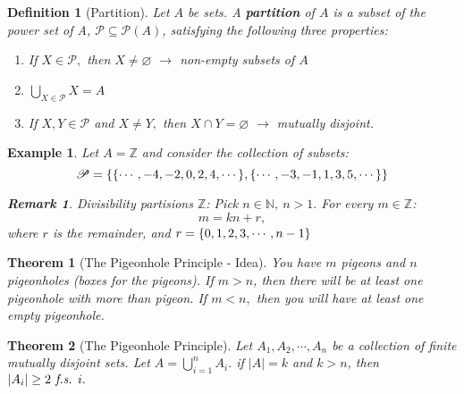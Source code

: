 \documentclass[12pt,a4paper]{article}
\newtheorem{thm}{Theorem}[subsection]
\newtheorem{df}{Definition}[subsection]
\newtheorem{eg}{Example}[subsection]
\newtheorem*{rmk}{\indent Remark}
\def\Z{{\mathbb{Z}}}
\def\N{{\mathbb{N}}}
\def\pow{{\mathcal{P}}}
\def\part{{\mathscr{P}}}
\def\emptyset{\varnothing}
\def\fs{\emph{ f.s. }}
\begin{document}
\begin{df}[Partition]
	Let $A$ be sets. A \textbf{partition} of $A$ is a subset of the power set of A, $\part\subseteq\pow(A)$, satisfying the following three properties:
	\begin{enumerate}
		\item If $X\in\part,$ then $X\neq\emptyset$ $\longrightarrow$ non-empty subsets of $A$
		\item $\displaystyle\bigcup_{X\in\part}X=A$
		\item If $X,Y\in\part$ and $X\neq Y,$ then $X\cap Y=\emptyset$ $\longrightarrow$ mutually disjoint.
	\end{enumerate}
\end{df}
\begin{eg}
	Let $A=\Z$ and consider the collection of subsets: \[\part=\qty{\qty{\cdots,-4,-2,0,2,4,\cdots},\qty{\cdots,-3,-1,1,3,5,\cdots}}\]	
	\begin{rmk} Divisibility partisions $\Z$: Pick $n\in\N,\ n>1.$ For every $m\in\Z$: \[m=kn+r,\] where $r$ is the remainder, and $r=\qty{0,1,2,3,\cdots,n-1}$ \end{rmk}
\end{eg}
\begin{thm}[The Pigeonhole Principle - Idea]
	You have $m$ pigeons and $n$ pigeonholes (boxes for the pigeons). If $m>n$, then there will be at least one pigeonhole with more than pigeon. If $m<n,$ then you will have at least one empty pigeonhole. 
\end{thm}
\begin{thm}[The Pigeonhole Principle]
	Let $A_1,A_2,\cdots,A_n$ be a collection of finite mutually disjoint sets. Let $\displaystyle A=\bigcup_{i=1}^n A_i.$ if $|A|=k$ and $k>n$, then $|A_i|\geq2\fs i.$	
\end{thm}
\end{document}
